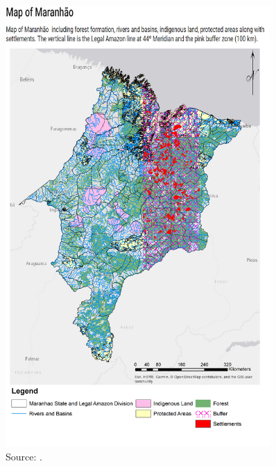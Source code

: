 \begin{figure}[H]
  \centering
  \includegraphics[width=0.9\textwidth, inner]{Settlements_title.png}
\caption{Source: \citep{MMMAwebsite,nugeo_2018,embrapa_2018, INCRA}.}
\label{fig:delimitacaosett}
\end{figure}

